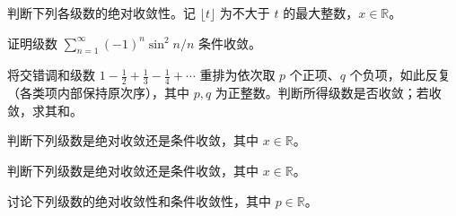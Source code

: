 \noindent\begin{minipage}{\textwidth}
判断下列各级数的绝对收敛性。记 $\lfloor t\rfloor$ 为不大于 $t$ 的最大整数，$x\in\mathbb R$。
\end{minipage}\par\vfill
\noindent\begin{minipage}{\textwidth}
证明级数 $\sum_{n=1}^{\infty}(-1)^n\sin^2n/n$ 条件收敛。
\end{minipage}\par\vfill
\newpage
\noindent\begin{minipage}{\textwidth}
将交错调和级数 $1-\frac12+\frac13-\frac14+\cdots$ 重排为依次取 $p$ 个正项、$q$ 个负项，如此反复（各类项内部保持原次序），其中 $p,q$ 为正整数。判断所得级数是否收敛；若收敛，求其和。
\end{minipage}\par\vfill
\noindent\begin{minipage}{\textwidth}
判断下列级数是绝对收敛还是条件收敛，其中 $x\in\mathbb R$。
\end{minipage}\par\vfill
\noindent\begin{minipage}{\textwidth}
判断下列级数是绝对收敛还是条件收敛，其中 $x\in\mathbb R$。
\end{minipage}\par\vfill
\newpage
\noindent\begin{minipage}{\textwidth}
讨论下列级数的绝对收敛性和条件收敛性，其中 $p\in\mathbb R$。
\end{minipage}\par\vfill
